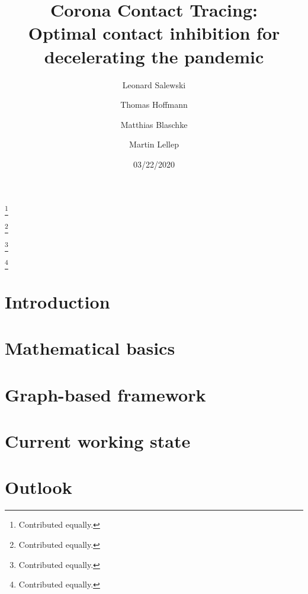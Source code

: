 \documentclass[%
 reprint,
 amsmath,amssymb,showkeys,
 aps,
]{revtex4-1}
\begin{document}
\title{Corona Contact Tracing:\\Optimal contact inhibition for decelerating the pandemic}

\author{Leonard Salewski}
\thanks{Contributed equally.}
\author{Thomas Hoffmann}
\thanks{Contributed equally.}
\author{Matthias Blaschke}
\thanks{Contributed equally.}
\author{Martin Lellep}
\thanks{Contributed equally.}

\date{03/22/2020}




\maketitle

\section{\label{sec:introcution}Introduction}



\section{\label{sec:basics}Mathematical basics}



\section{\label{sec:framework}Graph-based framework}



\section{\label{sec:working_state}Current working state}



\section{\label{sec:outlook}Outlook}





\end{document}
